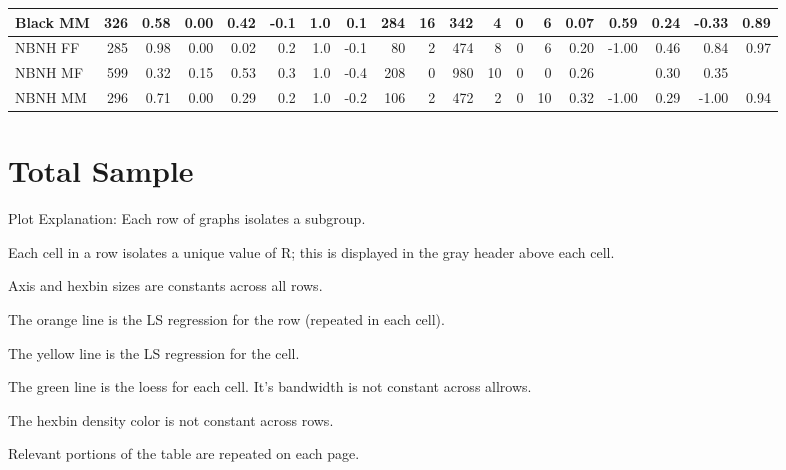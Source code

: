 \documentclass[a4paper]{article}
\begin{document}
\begin{table}[ht]
\begin{center}
{\begin{tabular}{lr|rrr|rrr|rrrrrr|rrrrr}
  Black MM & 326 & 0.58 & 0.00 & 0.42 & -0.1 & 1.0 & 0.1 & 284 & 16 & 342 & 4 & 0 & 6 & 0.07 & 0.59 & 0.24 & -0.33 & 0.89 \\ 
   \hline
NBNH FF & 285 & 0.98 & 0.00 & 0.02 & 0.2 & 1.0 & -0.1 & 80 & 2 & 474 & 8 & 0 & 6 & 0.20 & -1.00 & 0.46 & 0.84 & 0.97 \\ 
  NBNH MF & 599 & 0.32 & 0.15 & 0.53 & 0.3 & 1.0 & -0.4 & 208 & 0 & 980 & 10 & 0 & 0 & 0.26 &  & 0.30 & 0.35 &  \\ 
  NBNH MM & 296 & 0.71 & 0.00 & 0.29 & 0.2 & 1.0 & -0.2 & 106 & 2 & 472 & 2 & 0 & 10 & 0.32 & -1.00 & 0.29 & -1.00 & 0.94 \\ 
  \end{tabular}
}
\label{tab:two}
\end{center}
\end{table}%
\section{Total Sample}
Plot Explanation: Each row of graphs isolates a subgroup.  

Each cell in a row isolates a unique value of R; this is displayed in the gray header above each cell. 

Axis and hexbin sizes are constants across all rows.

The orange line is the LS regression for the row (repeated in each cell).

The yellow line is the LS regression for the cell.

The green line is the loess for each cell.  It's bandwidth is not constant across allrows.

The hexbin density color is not constant across rows.

Relevant portions of the table are repeated on each page.
\end{document}
